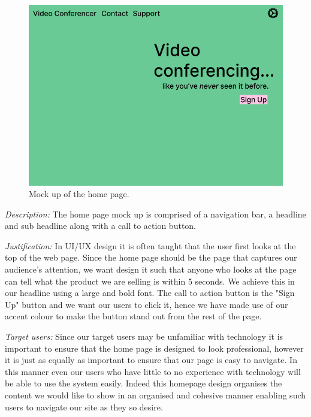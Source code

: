 \begin{figure}[H]
\centering

\includegraphics[scale=0.2]{Images/HomeUI_1.png}

\caption{Mock up of the home page.}
\label{fig:ui1}
\end{figure}

\textit{Description:}
The home page mock up is comprised of a navigation bar, a
headline and sub headline along with a call to action button.
\\ \vspace{0.2cm}

\textit{Justification:}
In UI/UX design it is often taught that the user first looks
at the top of the web page. Since the home page should be the
page that captures our audience's attention, we want design
it such that anyone who looks at the page can tell what the
product we are selling is within 5 seconds. We achieve this
in our headline using a large and bold font. The call to
action button is the "Sign Up" button and we want our users
to click it, hence we have made use of our accent colour to
make the button stand out from the rest of the page.\\
\vspace{0.2cm}

\textit{Target users:} Since
our target users may be unfamiliar with technology it is
important to ensure that the home page is designed to look
professional, however it is just as equally as important to
ensure that our page is easy to navigate. In this manner
even our users who have little to no experience with
technology will be able to use the system easily. Indeed
this homepage design organises the content we would like to
show in an organised and cohesive manner enabling such users
to navigate our site as they so desire. \\ \vspace{0.2cm}

